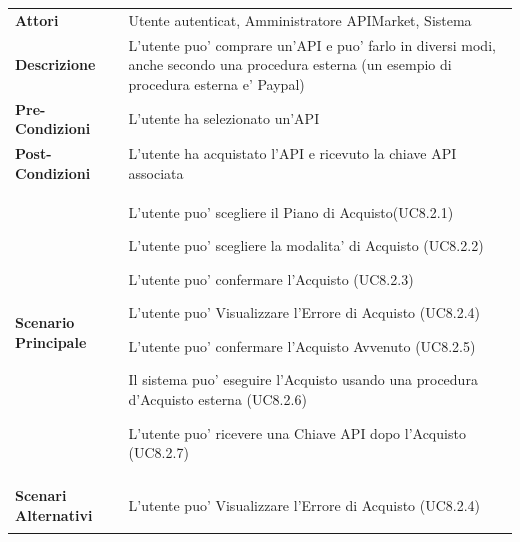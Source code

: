 \begin{longtable}{ l | p{11cm}}
	\hline
	\rowcolor{Gray}
	\multicolumn{2}{c}{UC8.2 - Procedura di Acquisto API}\\
	\hline
	 \textbf{Attori} & Utente autenticat, Amministratore APIMarket, Sistema \\
	\textbf{Descrizione} & L'utente puo' comprare un'API e puo' farlo in diversi modi, anche secondo una procedura esterna (un esempio di procedura esterna e' Paypal)\\
	\textbf{Pre-Condizioni} & L'utente ha selezionato un'API\\
	\textbf{Post-Condizioni} & L'utente ha acquistato l'API e ricevuto la chiave API associata\\
	\textbf{Scenario Principale} & 
	\begin{enumerate*}[label=(\arabic*.),itemjoin={\newline}]
		\item L'utente puo' scegliere il Piano di Acquisto(UC8.2.1)
		\item L'utente puo' scegliere la modalita' di Acquisto (UC8.2.2)
		\item L'utente puo' confermare l'Acquisto (UC8.2.3)
		\item L'utente puo' Visualizzare l'Errore di Acquisto (UC8.2.4)
		\item L'utente puo' confermare l'Acquisto Avvenuto (UC8.2.5)
		\item Il sistema puo' eseguire l'Acquisto usando una procedura d'Acquisto esterna (UC8.2.6)
		\item L'utente puo' ricevere una Chiave API dopo l'Acquisto (UC8.2.7)
	\end{enumerate*}\\
	\textbf{Scenari Alternativi} & 
	\begin{enumerate*}[label=(\arabic*.),itemjoin={\newline}]
		\item L'utente puo' Visualizzare l'Errore di Acquisto (UC8.2.4)
	\end{enumerate*}\\
\end{longtable}
